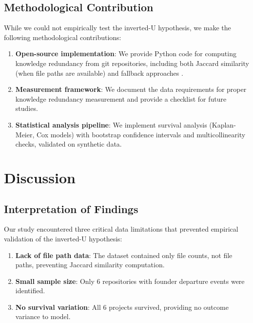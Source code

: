 \documentclass[11pt,letterpaper]{article}
\begin{document}
\subsection{Methodological Contribution}

While we could not empirically test the inverted-U hypothesis, we make the following methodological contributions:

\begin{enumerate}
    \item \textbf{Open-source implementation}: We provide Python code for computing knowledge redundancy from git repositories, including both Jaccard similarity (when file paths are available) and fallback approaches \cite{art_pOI-AO_xwHdm}.
    
    \item \textbf{Measurement framework}: We document the data requirements for proper knowledge redundancy measurement and provide a checklist for future studies.
    
    \item \textbf{Statistical analysis pipeline}: We implement survival analysis (Kaplan-Meier, Cox models) with bootstrap confidence intervals and multicollinearity checks, validated on synthetic data.
\end{enumerate}

\section{Discussion}

\subsection{Interpretation of Findings}

Our study encountered three critical data limitations that prevented empirical validation of the inverted-U hypothesis:

\begin{enumerate}
    \item \textbf{Lack of file path data}: The dataset contained only file counts, not file paths, preventing Jaccard similarity computation.
    \item \textbf{Small sample size}: Only 6 repositories with founder departure events were identified.
    \item \textbf{No survival variation}: All 6 projects survived, providing no outcome variance to model.
\end{enumerate}
\end{document}
